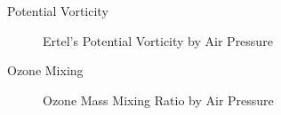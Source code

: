 \documentclass[
    hyperref={
        final,
        colorlinks=true,
        menucolor=black,
        anchorcolor=green,
        linkcolor=blue,
        citecolor=red,
        pdftitle={RS RAS Internship Presentation},
        pdfauthor={Moritz M. Konarski}
    }
]{beamer}
\begin{document}
\begin{frame}{Potential Vorticity}
\begin{figure}
    \vspace{-7pt}
    \caption{Ertel's Potential Vorticity by Air Pressure}
    \label{epv}
\end{figure}
\end{frame}

\begin{frame}{Ozone Mixing}
\begin{figure}
    \vspace{-7pt}
    \caption{Ozone Mass Mixing Ratio by Air Pressure}
    \label{ozone}
\end{figure}
\end{frame}
\end{document}
